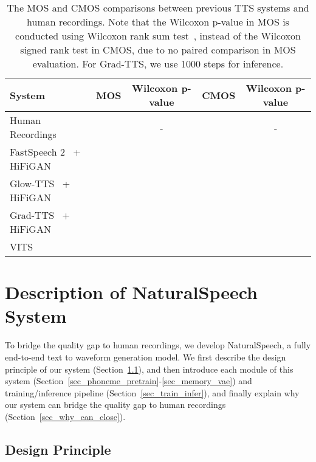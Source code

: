 \documentclass{article}
\theoremstyle{definition}
\def\myname{NaturalSpeech}
\begin{document}
\begin{table}[h!]
\small
\caption{The MOS and CMOS comparisons between previous TTS systems and human recordings. Note that the Wilcoxon p-value in MOS is conducted using Wilcoxon rank sum test~\citep{wilcoxon1992individual}, instead of the Wilcoxon signed rank test in CMOS, due to no paired comparison in MOS evaluation. For Grad-TTS, we use 1000 steps for inference.}
\centering
\begin{tabular}{ l | c c | c c}
    \toprule
	    System & MOS & Wilcoxon p-value & CMOS & Wilcoxon p-value \\
	    \midrule
	    Human Recordings  &   & - &  & - \\
	    \midrule
	    FastSpeech 2~\citep{ren2021fastspeech} + HiFiGAN~\citep{kong2020hifi} &  &  &  &  \\
	    Glow-TTS~\citep{kim2020glow} + HiFiGAN~\citep{kong2020hifi} &  &  &  & \\
Grad-TTS~\citep{popov2021grad} + HiFiGAN~\citep{kong2020hifi}  &   &  &  &  \\
	    VITS~\citep{kim2021conditional} &   &  &  &  \\
	    \bottomrule
	\end{tabular}
	\vspace{0.3cm}
	\label{tab_mos_cmos_judge_onpar}
\end{table}






\section{Description of \myname{} System}
\label{sec_method}


To bridge the quality gap to human recordings, we develop \myname{}, a fully end-to-end text to waveform generation model. We first describe the design principle of our system (Section~\ref{sec_deign_principle}), and then introduce each module of this system (Section~\ref{sec_phoneme_pretrain}-\ref{sec_memory_vae}) and training/inference pipeline (Section~\ref{sec_train_infer}), and finally explain why our system can bridge the quality gap to human recordings (Section~\ref{sec_why_can_close}). 

\subsection{Design Principle}
\label{sec_deign_principle}
\end{document}
